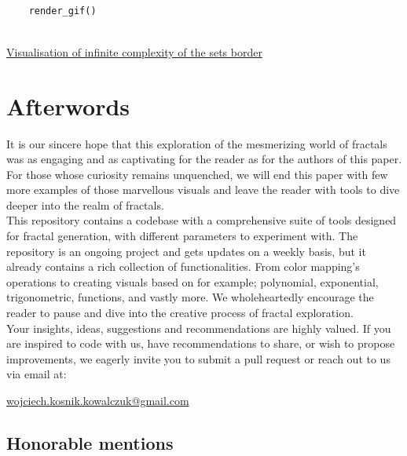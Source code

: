 \documentclass{article}
\begin{document}

\begin{lstlisting}[language=Python, caption=Execute zoom effect render]
	
	render_gif()
	
\end{lstlisting}

\begin{center}
	\footnotesize
	\href{run:Utils/article_dependencies/Implementation_chapter/render_10.gif}{Visualisation of infinite complexity of the sets border}
\end{center}

\newpage

\section{Afterwords}

It is our  sincere hope that this exploration of the mesmerizing world of fractals was as engaging and as captivating for the reader as for the authors of this paper. For those whose curiosity remains unquenched, we will end this paper with few more examples of those marvellous visuals and leave the reader with tools to dive deeper into the realm of fractals.
\\[1\baselineskip]
This repository contains a codebase with a comprehensive suite of tools designed for fractal generation, with different parameters to experiment with. The repository is an ongoing project and gets updates on a weekly basis, but it already contains a rich collection of functionalities. From color mapping's operations to creating visuals based on for example; polynomial, exponential, trigonometric, functions, and vastly more. We wholeheartedly encourage the reader to pause and dive into the creative process of fractal exploration.
\\[1\baselineskip]
Your insights, ideas, suggestions and recommendations are highly valued. If you are inspired to code with us, have recommendations to share, or wish to propose improvements, we eagerly invite you to submit a pull request or reach out to us via email at:
\begin{center}
	\href{mailto:wojciech.kosnik.kowalczuk@gmail.com}{wojciech.kosnik.kowalczuk@gmail.com}
\end{center}

\pagebreak
\subsection{Honorable mentions}
\end{document}
